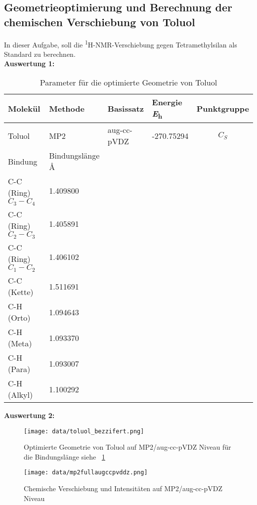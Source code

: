 \documentclass[12pt]{article}
\begin{document}
\begin{onehalfspace}

\section{Geometrieoptimierung und Berechnung der chemischen Verschiebung von Toluol}
In dieser Aufgabe, soll die \textsuperscript{1}H-NMR-Verschiebung gegen Tetramethylsilan als Standard zu berechnen. \\
\textbf{Auswertung 1:}

\begin{table}[!htpb]


\caption{ Parameter für die optimierte Geometrie von Toluol}
\begin{tabularx}{\textwidth}{llllc}
\toprule
Molekül  & Methode & Basissatz & Energie \si{\hartree} & Punktgruppe \\
\midrule
 Toluol & MP2 & aug-cc-pVDZ & -270.75294 &$C _S$\\
\midrule
 Bindung & Bindungslänge \si{\angstrom} & &  &\\
 C-C (Ring) $C_3 - C_4$ & 1.409800 &&&\\
 C-C (Ring) $C_2 - C_3$ & 1.405891 &&&\\
 C-C (Ring) $C_1 - C_2$ & 1.406102 &&&\\
 C-C (Kette) & 1.511691 &&&\\
 C-H (Orto)  & 1.094643 &&&\\
 C-H (Meta)  & 1.093370 &&&\\
 C-H (Para)  & 1.093007 &&&\\
 C-H (Alkyl) & 1.100292 &&&\\
\bottomrule
\end{tabularx}
\label{tab:toluol}
\end{table}

\textbf{Auswertung 2:}

\begin{figure}[!htpb]
  \texttt{[image: data/toluol\_bezzifert.png]}%
  \caption{Optimierte Geometrie von Toluol auf MP2/aug-cc-pVDZ Niveau für die Bindungslänge siehe ~\ref{tab:toluol}  }
\end{figure}
\begin{figure}[!htbp]
  \texttt{[image: data/mp2fullaugccpvddz.png]}%
  \caption{Chemische Verschiebung und Intensitäten auf MP2/aug-cc-pVDZ Niveau}
\end{figure}
\pagebreak


\end{onehalfspace}
\end{document}
